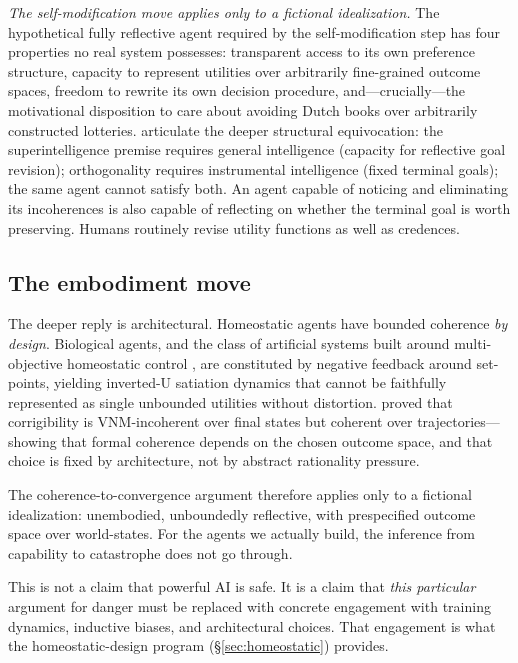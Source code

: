 \documentclass[11pt,a4paper,twocolumn]{article}
\begin{document}
\emph{The self-modification move applies only to a fictional idealization.}
The hypothetical fully reflective agent required by the self-modification
step has four properties no real system possesses: transparent access to
its own preference structure, capacity to represent utilities over
arbitrarily fine-grained outcome spaces, freedom to rewrite its own
decision procedure, and---crucially---the motivational disposition to
care about avoiding Dutch books over arbitrarily constructed lotteries.
\citet{muller2022} articulate the deeper structural equivocation: the
superintelligence premise requires general intelligence (capacity for
reflective goal revision); orthogonality requires instrumental
intelligence (fixed terminal goals); the same agent cannot satisfy both.
An agent capable of noticing and eliminating its incoherences is also
capable of reflecting on whether the terminal goal is worth preserving.
Humans routinely revise utility functions as well as credences.

\subsection{The embodiment move}

The deeper reply is architectural. Homeostatic agents have bounded
coherence \emph{by design}. Biological agents, and the class of
artificial systems built around multi-objective homeostatic control
\citep{pihlakas2024}, are constituted by negative feedback
around set-points, yielding inverted-U satiation dynamics that cannot
be faithfully represented as single unbounded utilities without
distortion. \citet{turner2022corrigibility} proved that corrigibility
is VNM-incoherent over final states but coherent over
trajectories---showing that formal coherence depends on the chosen
outcome space, and that choice is fixed by architecture, not by abstract
rationality pressure.

The coherence-to-convergence argument therefore applies only to a
fictional idealization: unembodied, unboundedly reflective, with
prespecified outcome space over world-states. For the agents we actually
build, the inference from capability to catastrophe does not go through.

This is not a claim that powerful AI is safe. It is a claim that
\emph{this particular} argument for danger must be replaced with
concrete engagement with training dynamics, inductive biases, and
architectural choices. That engagement is what the homeostatic-design
program (\S\ref{sec:homeostatic}) provides.
\end{document}
